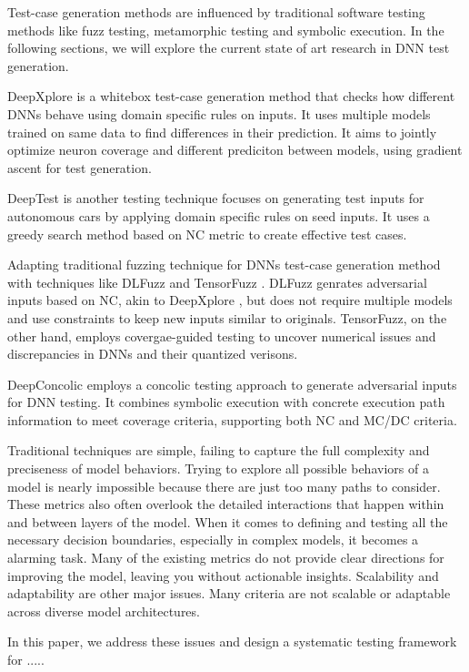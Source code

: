 \documentclass[10pt, conference, a4paper, final]{IEEEtran}
\begin{document}
Test-case generation methods are influenced by traditional software testing methods like fuzz testing, metamorphic testing and symbolic execution. In the following sections, we will explore the current state of art research in DNN test generation.

DeepXplore \cite{deepxplore} is a whitebox test-case generation method that checks how different DNNs behave using domain specific rules on inputs. It uses multiple models trained on same data to find differences in their prediction. It aims to jointly optimize neuron coverage and different prediciton  between models, using gradient ascent for test generation.


DeepTest \cite{deeptest} is another testing technique focuses on generating test inputs for autonomous cars by applying domain specific rules on seed inputs. It uses a greedy search method based on NC metric to create effective test cases.

Adapting traditional fuzzing technique for DNNs test-case generation method with techniques like DLFuzz \cite{dlfuzz} and TensorFuzz \cite{tensorfuzz}. DLFuzz genrates adversarial inputs based on NC, akin to DeepXplore \cite{deepxplore}, but does not require multiple models and use constraints to keep new inputs similar to originals. TensorFuzz, on the other hand, employs covergae-guided testing to uncover numerical issues and discrepancies in DNNs and their quantized verisons.

DeepConcolic \cite{deepconcolic} employs a concolic testing approach to generate adversarial inputs for DNN testing. It combines symbolic execution with concrete execution path information to meet coverage criteria, supporting both NC and MC/DC criteria.


Traditional techniques are simple, failing to capture the full complexity and preciseness of model behaviors. Trying to explore all possible behaviors of a model is nearly impossible because there are just too many paths to consider. These metrics also often overlook the detailed interactions that happen within and between layers of the model. When it comes to defining and testing all the necessary decision boundaries, especially in complex models, it becomes a alarming task.  Many of the existing metrics do not provide clear directions for improving the model, leaving you without actionable insights. Scalability and adaptability are other major issues. Many criteria are not scalable or adaptable across diverse model architectures.

In this paper, we address these issues and design a systematic testing framework for .....
\end{document}
